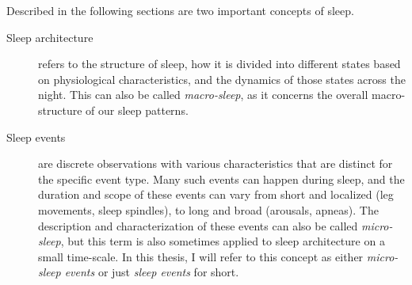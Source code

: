         Described in the following sections are two important concepts of sleep.
        \begin{description}
            \item[Sleep architecture] refers to the structure of sleep, how it is divided into different states based on physiological characteristics, and the dynamics of those states across the night.
            This can also be called \textit{macro-sleep}, as it concerns the overall macro-structure of our sleep patterns.
            \item[Sleep events] are discrete observations with various characteristics that are distinct for the specific event type.
            Many such events can happen during sleep, and the duration and scope of these events can vary from short and localized (leg movements, sleep spindles), to long and broad (arousals, apneas).
            The description and characterization of these events can also be called \textit{micro-sleep}, but this term is also sometimes applied to sleep architecture on a small time-scale.
            In this thesis, I will refer to this concept as either \textit{micro-sleep events} or just \textit{sleep events} for short.
        \end{description}
        
